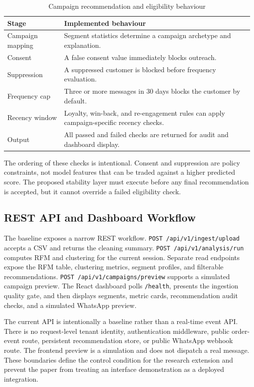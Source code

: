 \documentclass[conference]{IEEEtran}
\begin{document}
\begin{table}[!t]
\caption{Campaign recommendation and eligibility behaviour}
\label{tab:policy}
\centering
\small
\begin{tabular}{p{}p{}}
\toprule
Stage & Implemented behaviour \\
\midrule
Campaign mapping & Segment statistics determine a campaign archetype and explanation. \\
Consent & A false consent value immediately blocks outreach. \\
Suppression & A suppressed customer is blocked before frequency evaluation. \\
Frequency cap & Three or more messages in 30 days blocks the customer by default. \\
Recency window & Loyalty, win-back, and re-engagement rules can apply campaign-specific recency checks. \\
Output & All passed and failed checks are returned for audit and dashboard display. \\
\bottomrule
\end{tabular}
\end{table}

The ordering of these checks is intentional. Consent and suppression are policy constraints, not model features that can be traded against a higher predicted score. The proposed stability layer must execute before any final recommendation is accepted, but it cannot override a failed eligibility check.

\subsection{REST API and Dashboard Workflow}
The baseline exposes a narrow REST workflow. \texttt{POST /api/v1/ingest/upload} accepts a CSV and returns the cleaning summary. \texttt{POST /api/v1/analysis/run} computes RFM and clustering for the current session. Separate read endpoints expose the RFM table, clustering metrics, segment profiles, and filterable recommendations. \texttt{POST /api/v1/campaigns/preview} supports a simulated campaign preview. The React dashboard polls \texttt{/health}, presents the ingestion quality gate, and then displays segments, metric cards, recommendation audit checks, and a simulated WhatsApp preview.

The current API is intentionally a baseline rather than a real-time event API. There is no request-level tenant identity, authentication middleware, public order-event route, persistent recommendation store, or public WhatsApp webhook route. The frontend preview is a simulation and does not dispatch a real message. These boundaries define the control condition for the research extension and prevent the paper from treating an interface demonstration as a deployed integration.
\end{document}
